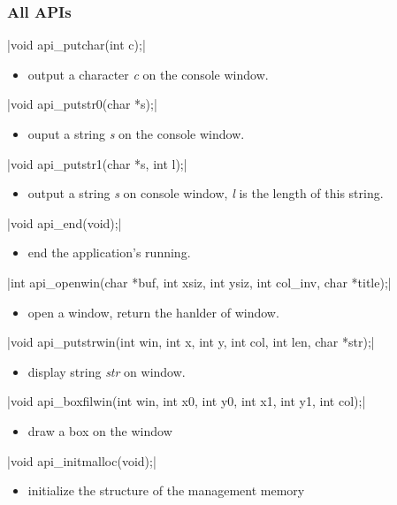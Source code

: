 \documentclass{swfcthesis}
\begin{document}
\subsubsection{All APIs}
\label{sec:all-apis}

\csingle|void api_putchar(int c);|
\begin{itemize}
\item output a character \emph{c} on the console window.
\end{itemize}

\csingle|void api_putstr0(char *s);|
\begin{itemize}
\item ouput a string \emph{s} on the console window.
\end{itemize}

\csingle|void api_putstr1(char *s, int l);|
\begin{itemize}
\item output a string \emph{s} on console window, \emph{l} is the length of this string.
\end{itemize}

\csingle|void api_end(void);|
\begin{itemize}
\item end the application's running.
\end{itemize}

\csingle|int api_openwin(char *buf, int xsiz, int ysiz, int col_inv, char *title);|
\begin{itemize}
\item open a window, return the hanlder of window.
\end{itemize}

\csingle|void api_putstrwin(int win, int x, int y, int col, int len, char *str);|
\begin{itemize}
\item display string \emph{str} on window. 
\end{itemize}

\csingle|void api_boxfilwin(int win, int x0, int y0, int x1, int y1, int col);|
\begin{itemize}
\item draw a box on the window
\end{itemize}

\csingle|void api_initmalloc(void);|
\begin{itemize}
\item initialize the structure of the management memory
\end{itemize}
\end{document}
